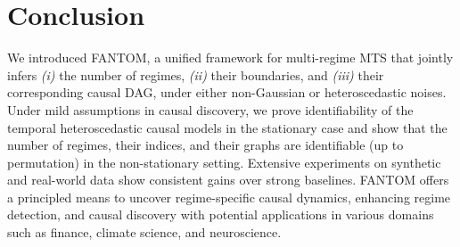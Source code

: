\section{Conclusion}
We introduced FANTOM, a unified framework for multi-regime MTS that jointly infers \textit{(i)} the number of regimes, \textit{(ii)} their boundaries, and \textit{(iii)} their corresponding causal DAG, under either non-Gaussian or heteroscedastic noises. Under mild assumptions in causal discovery, we prove identifiability of the temporal heteroscedastic causal models in the stationary case and show that the number of regimes, their indices, and their graphs are identifiable (up to permutation) in the non-stationary setting. Extensive experiments on synthetic and real-world data show consistent gains over strong baselines. FANTOM offers a principled means to uncover regime-specific causal dynamics, enhancing regime detection, and causal discovery with potential applications in various domains such as finance, climate science, and neuroscience.

